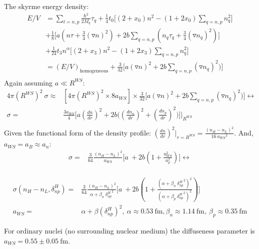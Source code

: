 \documentclass[11pt,letter]{article}
\begin{document}
The skyrme energy density:
\begin{equation}
 \begin{split}
  E/V &= \sum_{t=n,p}\frac{\hbar^2}{2M_q}\tau_q+\frac{1}{4}t_0\Big[(2+x_0)n^2-(1+2x_0)\sum_{q=n,p} n^2_q\Big]\\
  &+\frac{1}{8}\Big[ a (n \tau+\frac{3}{4}(\triangledown n)^2)+2b\sum_{q=n,p}(n_q \tau_q+\frac{3}{4}(\triangledown n_q)^2)\Big]\\
  &+\frac{1}{24}t_3n^{\alpha}\Big[(2+x_3)n^2-(1+2x_3)\sum_{q=n,p}n_q^2\Big]\\
  &=(E/V)_{\text{homogeneous}}+\frac{3}{32}\Big[ a (\triangledown n)^2+2b\sum_{q=n,p}(\triangledown n_q)^2)\Big]\\
 \end{split}
\end{equation}
Again assuming $a\ll R^{WS}$:
\begin{equation}
 \begin{split}
  4\pi (R^{WS})^2\ \sigma \approx& [4\pi (R^{WS})^2\times 8a_{WS}] \times   \frac{3}{32}\Big[ a (\triangledown n)^2+2b\sum_{q=n,p}(\triangledown n_q)^2)\Big] \leftrightarrow \\
\sigma =& \frac{3a_{WS}}{4} \Big[a (\frac{dn}{dr})^2 +2 b \big( (\frac{dn_n}{dr})^2+(\frac{dn_p}{dr})^2\big) \Big]\bigg |_{R^{WS}}\\ 
 \end{split}
\end{equation}
Given the functional form of the density profile: $(\frac{dn}{dr})^2 \bigg|_{r=R^{WS}} = \frac{(n_H-n_L)^2}{16\ {a_{WS}}^2}$.
And, $a_{WS}=a_B \approx a_n$:
\begin{equation}
 \begin{split}
  \sigma =& \frac{3}{64} \frac{(n_H-n_L)^2}{a_{WS}}  \big[a\  +2 b ( 1+\frac{a_{WS}^2}{a_p^2})\big]\leftrightarrow \\
 \end{split}
\end{equation}

\begin{mdframed}
\begin{equation*}
  \begin{split}
  \sigma(n_H-n_L,\delta^H_{np})=&\frac{3}{64} \frac{(n_H-n_L)^2}{\alpha+\beta_n \ {\delta^H_{np}}^2} \big[a\  +2 b ( 1+\frac{(\alpha+\beta_n \ {\delta^H_{np}}^2)^2}{(\alpha+\beta_p \ {\delta^H_{np}}^2)^2})\big]\\
  a_{WS} =& \alpha + \beta (\delta^{H}_{np})^2,\ \alpha \approx 0.53\ \text{fm}, \beta_n \approx 1.14\ \text{fm},\ \beta_p \approx 0.35\ \text{fm} 
  \end{split}
 \end{equation*}
\end{mdframed}
For ordinary nuclei (no surrounding nuclear medium) the diffuseness parameter is $a_{WS} = 0.55 \pm 0.05 \ \text{fm}$.
\end{document}
